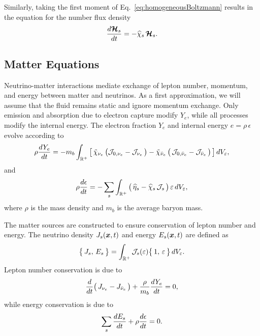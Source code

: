 \documentclass[12pt]{article}
\begin{document}
Similarly, taking the first moment of Eq.~\eqref{eq:homogeneousBoltzmann} results in the equation for the number flux density
\begin{equation}
  \frac{d \boldsymbol{\mathcal{H}}_{s}}{d t}
  =-\widehat{\chi}_{s}\,\boldsymbol{\mathcal{H}}_{s}.
  \label{eq:momentFlux}
\end{equation}

\subsection{Matter Equations}

Neutrino-matter interactions mediate exchange of lepton number, momentum, and energy between matter and neutrinos.  
As a first approximation, we will assume that the fluid remains static and ignore momentum exchange.  
Only emission and absorption due to electron capture modify $Y_{e}$, while all processes modify the internal energy.  
The electron fraction $Y_{e}$ and internal energy $e=\rho\,\epsilon$ evolve according to
\begin{equation}
  \rho\frac{d Y_{e}}{d t}
  =-m_{b}\int_{\mathbb{R}^{+}}
  \big[\,
    \tilde{\chi}_{\nu_{e}}\,\big(\mathcal{J}_{0,\nu_{e}}-\mathcal{J}_{\nu_{e}}\,\big)
    -\tilde{\chi}_{\bar{\nu}_{e}}\,\big(\,\mathcal{J}_{0,\bar{\nu}_{e}}-\mathcal{J}_{\bar{\nu}_{e}}\,\big)
  \,\big]\,dV_{\varepsilon},
\end{equation}
and
\begin{equation}
  \rho\frac{d \epsilon}{d t}
  =-\sum_{s}\int_{\mathbb{R}^{+}}\big(\,\widehat{\eta}_{s} - \widehat{\chi}_{s}\,\mathcal{J}_{s}\,\big)\,\varepsilon\,dV_{\varepsilon},
\end{equation}
where $\rho$ is the mass density and $m_{b}$ is the average baryon mass.  

The matter sources are constructed to ensure conservation of lepton number and energy.  
The neutrino density $J_{s}(\boldsymbol{x},t)$ and energy $E_{s}(\boldsymbol{x},t)$ are defined as
\begin{equation}
  \big\{\,J_{s},\,E_{s}\,\big\}
  =\int_{\mathbb{R}^{+}}\mathcal{J}_{s}(\varepsilon)\big\{\,1,\,\varepsilon\,\big\}\,dV_{\varepsilon}.
\end{equation}
Lepton number conservation is due to
\begin{equation}
  \frac{d }{d t}\big(\,J_{\nu_{e}}-J_{\bar{\nu}_{e}}\,\big)+\frac{\rho}{m_{b}}\frac{d Y_{e}}{d t} = 0,
\end{equation}
while energy conservation is due to
\begin{equation}
  \sum_{s}\frac{d E_{s}}{d t}+\rho\frac{d \epsilon}{d t} = 0.
\end{equation}
\end{document}
